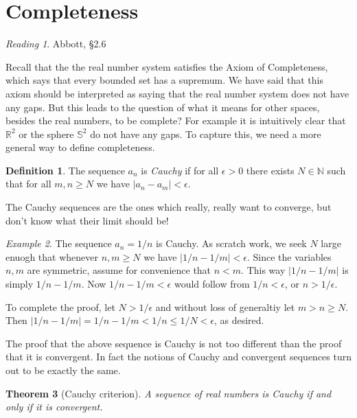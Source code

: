 \documentclass[11pt,oneside]{amsbook}
\newcommand{\N}{\mathbb N}
\newcommand{\R}{\mathbb R}
\theoremstyle{definition}
\theoremstyle{plain}
\newtheorem{theorem}{Theorem}[section]
\theoremstyle{definition}
\newtheorem{definition}[theorem]{Definition}
\theoremstyle{remark}
\newtheorem{example}[theorem]{Example}
\newtheorem*{reading}{Reading}
\numberwithin{equation}{section}
\numberwithin{figure}{section}
\begin{document}
\newpage
\section{Completeness}

\begin{reading}
  Abbott, \S 2.6
\end{reading}

Recall that the the real number system satisfies the Axiom of Completeness, which says that every bounded set has a supremum. We have said that this axiom should be interpreted as saying that the real number system does not have any gaps. But this leads to the question of what it means for other spaces, besides the real numbers, to be complete? For example it is intuitively clear that $\R^2$ or the sphere $\mathbb S^2$ do not have any gaps. To capture this, we need a more general way to define completeness.

\begin{definition}
  The sequence $a_n$ is \emph{Cauchy} if for all $\epsilon>0$ there exists $N\in\N$ such that for all $m,n\geq N$ we have $|a_n-a_m|<\epsilon$.
\end{definition}

The Cauchy sequences are the ones which really, really want to converge, but don't know what their limit should be!

\begin{example}
  The sequence $a_n=1/n$ is Cauchy. As scratch work, we seek $N$ large enuogh that whenever $n,m\geq N$ we have $|1/n-1/m|<\epsilon$. Since the variables $n,m$ are symmetric, assume for convenience that $n<m$. This way $|1/n-1/m|$ is simply $1/n-1/m$. Now $1/n-1/m<\epsilon$ would follow from $1/n<\epsilon$, or $n>1/\epsilon$.
  
  To complete the proof, let $N>1/\epsilon$ and without loss of generaltiy let $m>n\geq N$. Then $|1/n-1/m|=1/n-1/m<1/n\leq 1/N<\epsilon$, as desired.
\end{example}

The proof that the above sequence is Cauchy is not too different than the proof that it is convergent. In fact the notions of Cauchy and convergent sequences turn out to be exactly the same.

\begin{theorem}[Cauchy criterion]
  A sequence of real numbers is Cauchy if and only if it is convergent.
\end{theorem}
\end{document}
